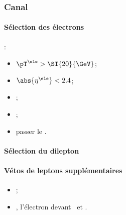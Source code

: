 \subsubsection{Canal \ele\ele}
\paragraph{Sélection des électrons}
:
\begin{itemize}
    \item $\pT^{\ele} > \SI{20}{\GeV}$;
    \item $\abs{\eta^{\ele}} < 2.4$;
    \item \Leptondzdxy;
    \item {};
    \item passer le \NinetyNineEleMVA.
\end{itemize}
\paragraph{Sélection du dilepton}
\AtLeastOneOSPair{\ele\ele}
\IfMoreOnePair
\paragraph{Vétos de leptons supplémentaires}
\LeptonVetoes
\begin{itemize}
    \item \LeptonVetoesExtraMuon;
    \item \LeptonVetoesExtraEleEleEle, l'électron devant \PassConversionVeto\ et \LessTwoMissingHitsVertex.
\end{itemize}
